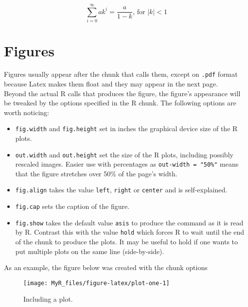\documentclass[]{book}
\newenvironment{Shaded}{}{}
\newcommand{\BaseNTok}[1]{\textcolor[rgb]{0.25,0.63,0.44}{#1}}
\providecommand{\tightlist}{%
  \setlength{\itemsep}{0pt}\setlength{\parskip}{0pt}}
\theoremstyle{definition}
\theoremstyle{definition}
\theoremstyle{definition}
\theoremstyle{remark}
\begin{document}
\[
\sum_{i=0}^{\infty} ak^{i} = \frac{a}{1-k} \text{, for }  \lvert k \rvert < 1
\]

\hypertarget{figures}{%
\section{Figures}\label{figures}}

Figures usually appear after the chunk that calls them, except on
\texttt{.pdf} format because Latex makes them float and they may appear
in the next page.\\
Beyond the actual R calls that produces the figure, the figure's
appearance will be tweaked by the options specified in the R chunk. The
following options are worth noticing:

\begin{itemize}
\tightlist
\item
  \texttt{fig.width} and \texttt{fig.height} set in inches the graphical
  device size of the R plots.
\item
  \texttt{out.width} and \texttt{out.height} set the size of the R
  plots, including possibly rescaled images. Easier use with percentages
  as \texttt{out-width\ =\ "50\%"} means that the figure stretches over
  50\% of the page's width.
\item
  \texttt{fig.align} takes the value \texttt{left}, \texttt{right} or
  \texttt{center} and is self-explained.
\item
  \texttt{fig.cap} sets the caption of the figure.
\item
  \texttt{fig.show} takes the default value \texttt{asis} to produce the
  command as it is read by R. Contrast this with the value \texttt{hold}
  which forces R to wait until the end of the chunk to produce the
  plots. It may be useful to hold if one wants to put multiple plots on
  the same line (side-by-side).
\end{itemize}

As an example, the figure below was created with the chunk options

\begin{Shaded}
\end{Shaded}

\begin{figure}

{\centering \texttt{[image: MyR\_files/figure-latex/plot-one-1]} 

}

\caption{Including a plot.}\label{fig:plot-one}
\end{figure}
\end{document}
